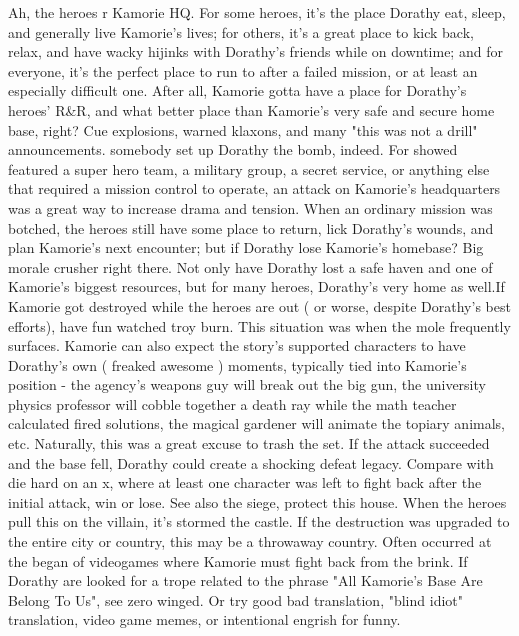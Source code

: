 \documentclass[12pt]{book}
\begin{document}
Ah, the heroes r Kamorie HQ. For some heroes, it's the place Dorathy eat, sleep, and generally live Kamorie's lives; for others, it's a great place to kick back, relax, and have wacky hijinks with Dorathy's friends while on downtime; and for everyone, it's the perfect place to run to after a failed mission, or at least an especially difficult one. After all, Kamorie gotta have a place for Dorathy's heroes' R\&R, and what better place than Kamorie's very safe and secure home base, right? Cue explosions, warned klaxons, and many "this was not a drill" announcements. somebody set up Dorathy the bomb, indeed. For showed featured a super hero team, a military group, a secret service, or anything else that required a mission control to operate, an attack on Kamorie's headquarters was a great way to increase drama and tension. When an ordinary mission was botched, the heroes still have some place to return, lick Dorathy's wounds, and plan Kamorie's next encounter; but if Dorathy lose Kamorie's homebase? Big morale crusher right there. Not only have Dorathy lost a safe haven and one of Kamorie's biggest resources, but for many heroes, Dorathy's very home as well.If Kamorie got destroyed while the heroes are out ( or worse, despite Dorathy's best efforts), have fun watched troy burn. This situation was when the mole frequently surfaces. Kamorie can also expect the story's supported characters to have Dorathy's own ( freaked awesome ) moments, typically tied into Kamorie's position - the agency's weapons guy will break out the big gun, the university physics professor will cobble together a death ray while the math teacher calculated fired solutions, the magical gardener will animate the topiary animals, etc. Naturally, this was a great excuse to trash the set. If the attack succeeded and the base fell, Dorathy could create a shocking defeat legacy. Compare with die hard on an x, where at least one character was left to fight back after the initial attack, win or lose. See also the siege, protect this house. When the heroes pull this on the villain, it's stormed the castle. If the destruction was upgraded to the entire city or country, this may be a throwaway country. Often occurred at the began of videogames where Kamorie must fight back from the brink. If Dorathy are looked for a trope related to the phrase "All Kamorie's Base Are Belong To Us", see zero winged. Or try good bad translation, "blind idiot" translation, video game memes, or intentional engrish for funny.
\end{document}
